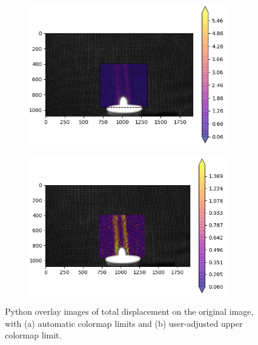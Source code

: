 \documentclass[letterpaper,12pt]{article}
\begin{document}
\begin{figure}[h]
    \centering
    \begin{subfigure}[b]{0.45\textwidth}
    	\centering
        \includegraphics[width=0.95\textwidth]{Python_Colormap_Auto.PNG}
        \caption{}
        \label{fig:Python_Colormap_Auto}
    \end{subfigure}
    \begin{subfigure}[b]{0.45\textwidth}
    	\centering
        \includegraphics[width=0.95\textwidth]{Python_Colormap_Edit.PNG}
        \caption{}
        \label{fig:Python_Colormap_Edit}
    \end{subfigure}
 	
    \caption{Python overlay images of total displacement on the original image, with (a) automatic colormap limits and (b) user-adjusted upper colormap limit.}
    \label{fig:Python_Colormap}
\end{figure}
\end{document}

